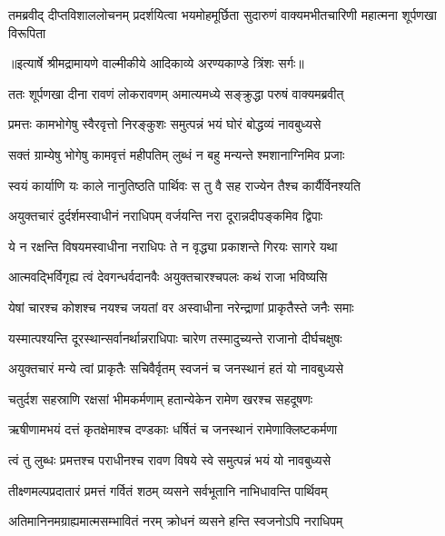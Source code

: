 \fourlineindentedshloka
{तमब्रवीद् दीप्तविशाललोचनम्}
{प्रदर्शयित्वा भयमोहमूर्छिता}
{सुदारुणं वाक्यमभीतचारिणी}
{महात्मना शूर्पणखा विरूपिता} %


{॥इत्यार्षे श्रीमद्रामायणे वाल्मीकीये आदिकाव्ये अरण्यकाण्डे त्रिंशः सर्गः॥}


\twolineshloka
{ततः शूर्पणखा दीना रावणं लोकरावणम्}
{अमात्यमध्ये सङ्क्रुद्धा परुषं वाक्यमब्रवीत्} %

\twolineshloka
{प्रमत्तः कामभोगेषु स्वैरवृत्तो निरङ्कुशः}
{समुत्पन्नं भयं घोरं बोद्धव्यं नावबुध्यसे} %

\twolineshloka
{सक्तं ग्राम्येषु भोगेषु कामवृत्तं महीपतिम्}
{लुब्धं न बहु मन्यन्ते श्मशानाग्निमिव प्रजाः} %

\twolineshloka
{स्वयं कार्याणि यः काले नानुतिष्ठति पार्थिवः}
{स तु वै सह राज्येन तैश्च कार्यैर्विनश्यति} %

\twolineshloka
{अयुक्तचारं दुर्दर्शमस्वाधीनं नराधिपम्}
{वर्जयन्ति नरा दूरान्नदीपङ्कमिव द्विपाः} %

\twolineshloka
{ये न रक्षन्ति विषयमस्वाधीना नराधिपः}
{ते न वृद्ध्या प्रकाशन्ते गिरयः सागरे यथा} %

\twolineshloka
{आत्मवद्भिर्विगृह्य त्वं देवगन्धर्वदानवैः}
{अयुक्तचारश्चपलः कथं राजा भविष्यसि} %

\twolineshloka
{येषां चारश्च कोशश्च नयश्च जयतां वर}
{अस्वाधीना नरेन्द्राणां प्राकृतैस्ते जनैः समाः} %

\twolineshloka
{यस्मात्पश्यन्ति दूरस्थान्सर्वानर्थान्नराधिपाः}
{चारेण तस्मादुच्यन्ते राजानो दीर्घचक्षुषः} %

\twolineshloka
{अयुक्तचारं मन्ये त्वां प्राकृतैः सचिवैर्वृतम्}
{स्वजनं च जनस्थानं हतं यो नावबुध्यसे} %

\twolineshloka
{चतुर्दश सहस्राणि रक्षसां भीमकर्मणाम्}
{हतान्येकेन रामेण खरश्च सहदूषणः} %

\twolineshloka
{ऋषीणामभयं दत्तं कृतक्षेमाश्च दण्डकाः}
{धर्षितं च जनस्थानं रामेणाक्लिष्टकर्मणा} %

\twolineshloka
{त्वं तु लुब्धः प्रमत्तश्च पराधीनश्च रावण}
{विषये स्वे समुत्पन्नं भयं यो नावबुध्यसे} %

\twolineshloka
{तीक्ष्णमल्पप्रदातारं प्रमत्तं गर्वितं शठम्}
{व्यसने सर्वभूतानि नाभिधावन्ति पार्थिवम्} %

\twolineshloka
{अतिमानिनमग्राह्यमात्मसम्भावितं नरम्}
{क्रोधनं व्यसने हन्ति स्वजनोऽपि नराधिपम्} %

